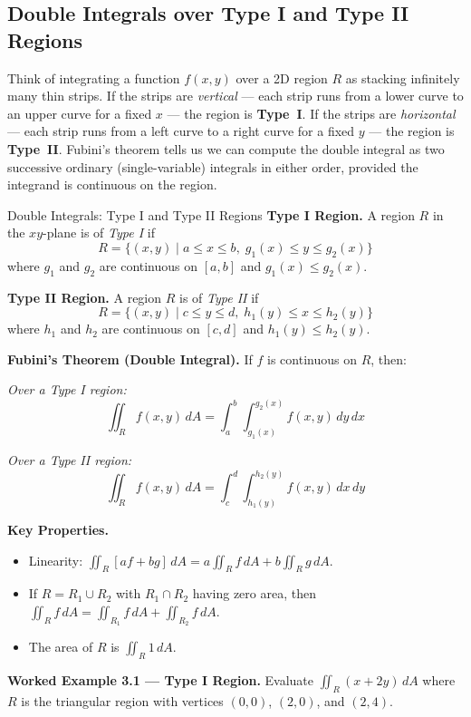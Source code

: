 \documentclass[12pt,a4paper]{article}
\begin{document}
\subsection{Double Integrals over Type I and Type II Regions}

Think of integrating a function \(f(x,y)\) over a 2D region \(R\) as stacking infinitely many thin strips. If the strips are \emph{vertical} --- each strip runs from a lower curve to an upper curve for a fixed \(x\) --- the region is \textbf{Type~I}. If the strips are \emph{horizontal} --- each strip runs from a left curve to a right curve for a fixed \(y\) --- the region is \textbf{Type~II}. Fubini's theorem tells us we can compute the double integral as two successive ordinary (single-variable) integrals in either order, provided the integrand is continuous on the region.

\begin{infobox}{Double Integrals: Type I and Type II Regions}
\textbf{Type I Region.} A region \(R\) in the \(xy\)-plane is of \emph{Type I} if
\[
  R = \{(x,y) \mid a \le x \le b,\; g_1(x) \le y \le g_2(x)\}
\]
where \(g_1\) and \(g_2\) are continuous on \([a,b]\) and \(g_1(x) \le g_2(x)\).

\textbf{Type II Region.} A region \(R\) is of \emph{Type II} if
\[
  R = \{(x,y) \mid c \le y \le d,\; h_1(y) \le x \le h_2(y)\}
\]
where \(h_1\) and \(h_2\) are continuous on \([c,d]\) and \(h_1(y) \le h_2(y)\).

\textbf{Fubini's Theorem (Double Integral).} If \(f\) is continuous on \(R\), then:

\emph{Over a Type I region:}
\[
  \iint_R f(x,y)\,dA = \int_a^b \int_{g_1(x)}^{g_2(x)} f(x,y)\,dy\,dx
\]

\emph{Over a Type II region:}
\[
  \iint_R f(x,y)\,dA = \int_c^d \int_{h_1(y)}^{h_2(y)} f(x,y)\,dx\,dy
\]

\textbf{Key Properties.}
\begin{itemize}[nosep]
  \item Linearity: \(\iint_R [af+bg]\,dA = a\iint_R f\,dA + b\iint_R g\,dA\).
  \item If \(R = R_1 \cup R_2\) with \(R_1 \cap R_2\) having zero area, then \(\iint_R f\,dA = \iint_{R_1} f\,dA + \iint_{R_2} f\,dA\).
  \item The area of \(R\) is \(\iint_R 1\,dA\).
\end{itemize}
\end{infobox}

\textbf{Worked Example 3.1 --- Type I Region.}
Evaluate \(\displaystyle\iint_R (x + 2y)\,dA\) where \(R\) is the triangular region with vertices \((0,0)\), \((2,0)\), and \((2,4)\).
\end{document}
